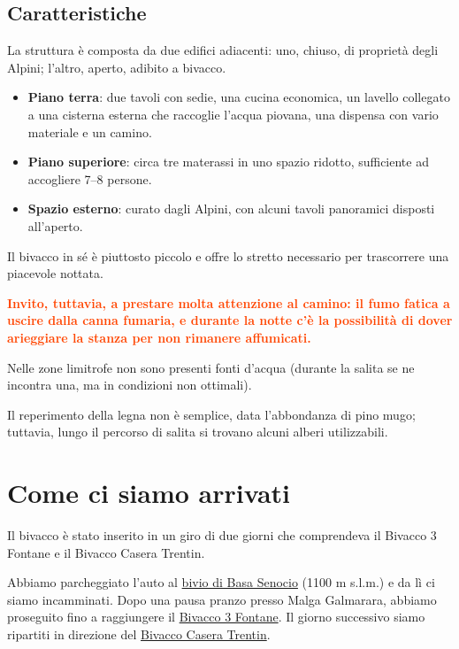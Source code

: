 \documentclass{article}
\begin{document}
\subsection{Caratteristiche}

La struttura è composta da due edifici adiacenti: uno, chiuso, di proprietà degli Alpini; l’altro, aperto, adibito a bivacco.  
\begin{itemize}
    \item \textbf{Piano terra}: due tavoli con sedie, una cucina economica, un lavello collegato a una cisterna esterna che raccoglie l’acqua piovana, una dispensa con vario materiale e un camino.
    \item \textbf{Piano superiore}: circa tre materassi in uno spazio ridotto, sufficiente ad accogliere 7–8 persone.
    \item \textbf{Spazio esterno}: curato dagli Alpini, con alcuni tavoli panoramici disposti all’aperto. 
\end{itemize}

Il bivacco in sé è piuttosto piccolo e offre lo stretto necessario per trascorrere una piacevole nottata.  

\textbf{\textcolor{OrangeRed}{Invito, tuttavia, a prestare molta attenzione al camino: il fumo fatica a uscire dalla canna fumaria, e durante la notte c'è la possibilità di dover arieggiare la stanza per non rimanere affumicati.}}

Nelle zone limitrofe non sono presenti fonti d’acqua (durante la salita se ne incontra una, ma in condizioni non ottimali). 

Il reperimento della legna non è semplice, data l’abbondanza di pino mugo; tuttavia, lungo il percorso di salita si trovano alcuni alberi utilizzabili.


\section{Come ci siamo arrivati}
Il bivacco è stato inserito in un giro di due giorni che comprendeva il Bivacco 3 Fontane e il Bivacco Casera Trentin.

Abbiamo parcheggiato l’auto al  \href{https://maps.google.com/?q=45.92169696155084,11.476606212370115}{bivio di Basa Senocio} (1100 m s.l.m.) e da lì ci siamo incamminati. Dopo una pausa pranzo presso Malga Galmarara, abbiamo proseguito fino a raggiungere il \href{https://maps.google.com/?q=45.96649411078783,11.494243131410462}{Bivacco 3 Fontane}. Il giorno successivo siamo ripartiti in direzione del \href{https://maps.google.com/?q=45.96667,11.45000}{Bivacco Casera Trentin}.
\end{document}

